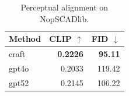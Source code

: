 \begin{table}[t]
\centering
\caption{Perceptual alignment on NopSCADlib.}
\label{tab:perceptual_nopscadlib}
\begin{tabular}{lrr}
\toprule
Method & CLIP $\uparrow$ & FID $\downarrow$ \\
\midrule
craft & \textbf{0.2226} & \textbf{95.11} \\
gpt4o & 0.2033 & 119.42 \\
gpt52 & 0.2145 & 106.22 \\
\bottomrule
\end{tabular}
\end{table}
